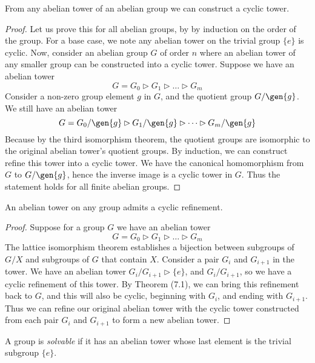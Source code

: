 \begin{theorem}
    From any abelian tower of an abelian group we can construct a cyclic tower.
\end{theorem}
\begin{proof}
    Let us prove this for all abelian groups, by by induction on the order of the group. For a base case, we note any abelian tower on the trivial group $\{e\}$ is cyclic. Now, consider an abelian group $G$ of order $n$ where an abelian tower of any smaller group can be constructed into a cyclic tower. Suppose we have an abelian tower
    \[ G = G_0 \rhd G_1 \rhd \dots \rhd G_m \]
    Consider a non-zero group element $g$ in $G$, and the quotient group $G/\gen{g}$. We still have an abelian tower
    \[ G = G_0/\gen{g} \rhd G_1/\gen{g} \rhd \dots \rhd G_m/\gen{g} \]
    Because by the third isomorphism theorem, the quotient groups are isomorphic to the original abelian tower's quotient groups. By induction, we can construct refine this tower into a cyclic tower. We have the canonical homomorphism from $G$ to $G/\gen{g}$, hence the inverse image is a cyclic tower in $G$. Thus the statement holds for all finite abelian groups.
\end{proof}

\begin{corollary}
    An abelian tower on any group admits a cyclic refinement.
\end{corollary}
\begin{proof}
    Suppose for a group $G$ we have an abelian tower
    \[ G = G_0 \rhd G_1 \rhd \dots \rhd G_m \]
    The lattice isomorphism theorem establishes a bijection between subgroups of $G/X$ and subgroups of $G$ that contain $X$. Consider a pair $G_i$ and $G_{i+1}$ in the tower. We have an abelian tower $G_i/G_{i+1} \rhd \{e\}$, and $G_i/G_{i+1}$, so we have a cyclic refinement of this tower. By Theorem (7.1), we can bring this refinement back to $G$, and this will also be cyclic, beginning with $G_i$, and ending with $G_{i+1}$. Thus we can refine our original abelian tower with the cyclic tower constructed from each pair $G_i$ and $G_{i+1}$ to form a new abelian tower.
\end{proof}

A group is \emph{solvable}  if it has an abelian tower whose last element is the trivial subgroup $\{e\}$.

